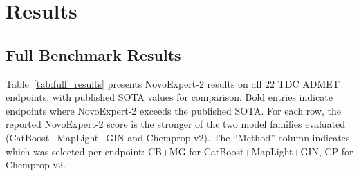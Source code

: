 \documentclass[11pt]{article}
\begin{document}
\section{Results}

\subsection{Full Benchmark Results}

Table~\ref{tab:full_results} presents NovoExpert-2 results on all 22 TDC ADMET endpoints, with published SOTA values for comparison. Bold entries indicate endpoints where NovoExpert-2 exceeds the published SOTA. For each row, the reported NovoExpert-2 score is the stronger of the two model families evaluated (CatBoost+MapLight+GIN and Chemprop v2). The ``Method'' column indicates which was selected per endpoint: CB+MG for CatBoost+MapLight+GIN, CP for Chemprop v2.
\end{document}
